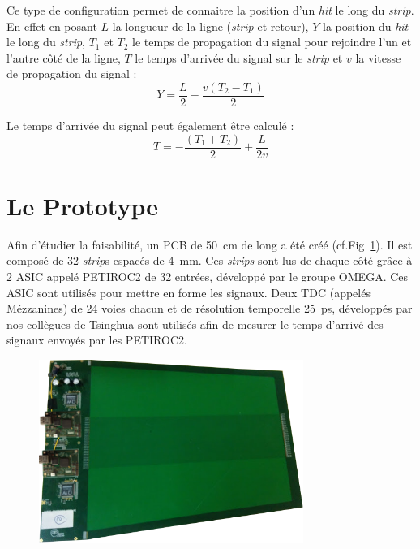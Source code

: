 Ce type de configuration permet de connaitre la position d'un \textit{hit} le long du \textit{strip}. En effet en posant $L$ la longueur de la ligne (\textit{strip} et retour), $Y$ la position du \textit{hit} le long du \textit{strip}, $T_1$ et $T_2$ le temps de propagation du signal pour rejoindre l'un et l'autre côté de la ligne, $T$ le temps d'arrivée du signal sur le \textit{strip} et $v$ la vitesse de propagation du signal :
\begin{equation}
\label{eqqq}
Y=\frac{L}{2}-\frac{v(T_2-T_1)}{2}
\end{equation} 

Le temps d'arrivée du signal peut également être calculé :
\begin{equation}
\label{myformule}
T=-\frac{(T_1+T_2)}{2}+\frac{L}{2v}
\end{equation}

\section{Le Prototype}
Afin d'étudier la faisabilité, un PCB de \SI{50}{\centi\meter} de long a été créé (cf.Fig~\ref{PCB2}). Il est composé de \num{32} \textit{strip}s espacés de \SI{4}{\milli\meter}. Ces \textit{strips} sont lus de chaque côté grâce à \num{2} ASIC appelé PETIROC2 \cite{Monzo:2017quz} de \num{32} entrées, développé par le groupe OMEGA. Ces ASIC sont utilisés pour mettre en forme les signaux. Deux TDC (appelés Mézzanines) de \num{24} voies chacun et de résolution temporelle \SI{25}{\pico\second}, développés par nos collègues de Tsinghua sont utilisés afin de mesurer le temps d'arrivé des signaux envoyés par les PETIROC2.

\begin{figure}[ht!]
	\centering
	\includegraphics[width=0.77\textwidth]{ELE/PCB2.png}
	\label{PCB2}
\end{figure}

